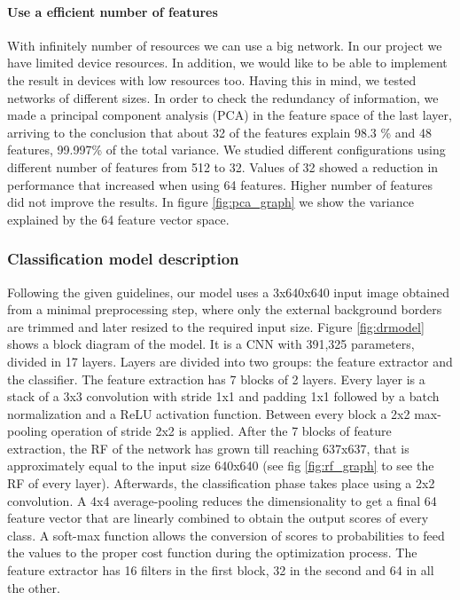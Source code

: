 \documentclass[review]{elsarticle}
\theoremstyle{definition} %
\theoremstyle{remark}
\begin{document}
\paragraph{Use a efficient number of features} With infinitely number of resources we can use a big network. In our project we have limited device resources. In addition, we would like to be able to implement the result in devices with low resources too. Having this in mind, we tested networks of different sizes. In order to check the redundancy of information, we made a principal component analysis (PCA) in the feature space of the last layer, arriving to the conclusion that about 32 of the features explain 98.3 \% and 48 features, 99.997\% of the total variance. We studied different configurations using different number of features from 512 to 32. Values of 32 showed a reduction in performance that increased when using 64 features. Higher number of features did not improve the results. In figure \ref{fig:pca_graph} we show the variance explained by the 64 feature vector space.

\subsubsection{Classification model description}

Following the given guidelines, our model uses a 3x640x640 input image obtained from a minimal preprocessing step, where only the external background borders are trimmed and later resized to the required input size. Figure \ref{fig:drmodel} shows a block diagram of the model. It is a CNN with 391,325 parameters, divided in 17 layers. Layers are divided into two groups: the feature extractor and the classifier. The feature extraction has 7 blocks of 2 layers. Every layer is a stack of a 3x3 convolution with stride 1x1 and padding 1x1 followed by a batch normalization and a ReLU activation function. Between every block a 2x2 max-pooling operation of stride 2x2 is applied. After the 7 blocks of feature extraction, the RF of the network has grown till reaching 637x637, that is approximately equal to the input size 640x640 (see fig \ref{fig:rf_graph} to see the RF of every layer). Afterwards, the classification phase takes place using a 2x2 convolution. A 4x4 average-pooling reduces the dimensionality to get a final 64 feature vector that are linearly combined to obtain the output scores of every class. A soft-max function allows the conversion of scores to probabilities to feed the values to the proper cost function during the optimization process. The feature extractor has 16 filters in the first block, 32 in the second and 64 in all the other.
\end{document}
